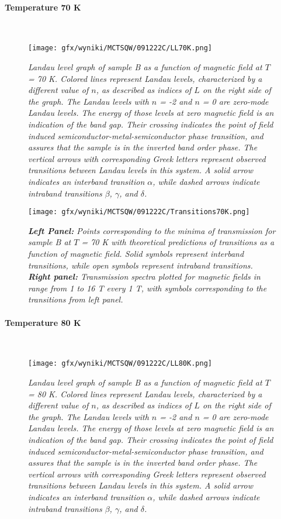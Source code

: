 \documentclass[titlepage,a4paper]{book}
\newcommand{\wciecie}{\quad\phantom{v}}
\newcommand{\myparagraph}[1]{\paragraph{#1}\mbox{}\\}
\begin{document}
\myparagraph{Temperature 70 K}
\wciecie
\begin{figure}[H]
	\centering
	\texttt{[image: gfx/wyniki/MCTSQW/091222C/LL70K.png]}
	\vspace{-10pt}
	\caption{\textit{Landau level graph of sample B as a function of magnetic field at $T$ = 70 K. Colored lines represent Landau levels, characterized by a different value of $n$, as described as indices of $L$ on the right side of the graph. The Landau levels with $n$ = -2 and $n$ = 0 are zero-mode Landau levels. The energy of those levels at zero magnetic field is an indication of the band gap. Their crossing indicates the point of field induced semiconductor-metal-semiconductor phase transition, and assures that the sample is in the inverted band order phase. The vertical arrows with corresponding Greek letters represent observed transitions between Landau levels in this system. A solid arrow indicates an interband transition $\alpha$, while dashed arrows indicate intraband transitions $\beta$, $\gamma$, and $\delta$.}}
	\label{fig:LL_SQW_70K}
\end{figure}

\begin{figure}[H]
	\centering
	\texttt{[image: gfx/wyniki/MCTSQW/091222C/Transitions70K.png]}
	\vspace{-10pt}
	\caption{\textit{\textbf{Left Panel:} Points corresponding to the minima of transmission for sample B at $T$ = 70 K with theoretical predictions of transitions as a function of magnetic field. Solid symbols represent interband transitions, while open symbols represent intraband transitions. \textbf{Right panel:} Transmission spectra plotted for magnetic fields in range from 1 to 16 T every 1 T, with symbols corresponding to the transitions from left panel.}}
	\label{fig:Summary_SQW_70K}
\end{figure}


\clearpage
\myparagraph{Temperature 80 K}
\wciecie
\begin{figure}[H]
	\centering
	\texttt{[image: gfx/wyniki/MCTSQW/091222C/LL80K.png]}
	\vspace{-10pt}
	\caption{\textit{Landau level graph of sample B as a function of magnetic field at $T$ = 80 K. Colored lines represent Landau levels, characterized by a different value of $n$, as described as indices of $L$ on the right side of the graph. The Landau levels with $n$ = -2 and $n$ = 0 are zero-mode Landau levels. The energy of those levels at zero magnetic field is an indication of the band gap. Their crossing indicates the point of field induced semiconductor-metal-semiconductor phase transition, and assures that the sample is in the inverted band order phase. The vertical arrows with corresponding Greek letters represent observed transitions between Landau levels in this system. A solid arrow indicates an interband transition $\alpha$, while dashed arrows indicate intraband transitions $\beta$, $\gamma$, and $\delta$.}}
	\label{fig:LL_SQW_80K}
\end{figure}
\end{document}
